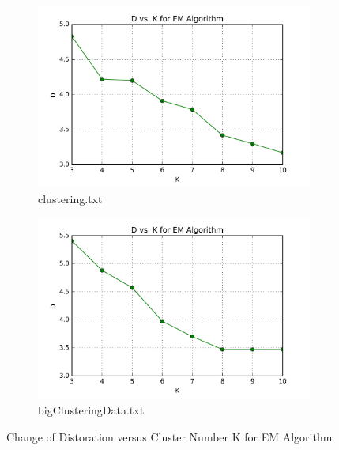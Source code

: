 \begin{description}
\begin{description}
\begin{figure}[H]
\centering
\centering
        \begin{subfigure}[b]{0.49\textwidth}
            \centering
            \includegraphics[width=\textwidth]{./figures/loss_clustering_EM.png}
            \caption{clustering.txt}\label{fig:13a}
        \end{subfigure}
        \hfill
        \begin{subfigure}[b]{0.49\textwidth}  
            \centering 
            \includegraphics[width=\textwidth]{./figures/loss_bigClustering_EM.png}
            \caption{bigClusteringData.txt}\label{fig:13b}
        \end{subfigure}
\caption{Change of Distoration versus Cluster Number K for EM Algorithm}
\label{fig:EM-loss} 
\end{figure}


\end{description}
\end{description}
